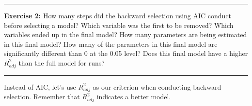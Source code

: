 \documentclass[]{book}
\newenvironment{Shaded}{\begin{snugshade}}{\end{snugshade}}
\newcommand{\KeywordTok}[1]{\textcolor[rgb]{0.13,0.29,0.53}{\textbf{#1}}}
\newcommand{\NormalTok}[1]{#1}
\newcommand{\OperatorTok}[1]{\textcolor[rgb]{0.81,0.36,0.00}{\textbf{#1}}}
\newcommand{\StringTok}[1]{\textcolor[rgb]{0.31,0.60,0.02}{#1}}
\theoremstyle{definition}
\theoremstyle{definition}
\theoremstyle{definition}
\theoremstyle{remark}
\begin{document}
\begin{center}\rule{0.5\linewidth}{\linethickness}\end{center}

\textbf{Exercise 2:} How many steps did the backward selection using AIC
conduct before selecting a model? Which variable was the first to be
removed? Which variables ended up in the final model? How many
parameters are being estimated in this final model? How many of the
parameters in this final model are significantly different than 0 at the
0.05 level? Does this final model have a higher \(R^2_{adj}\) than the
full model for runs?

\begin{center}\rule{0.5\linewidth}{\linethickness}\end{center}

Instead of AIC, let's use \(R^2_{adj}\) as our criterion when conducting
backward selection. Remember that \(R^2_{adj}\) indicates a better
model.

\begin{Shaded}
\end{Shaded}
\end{document}
